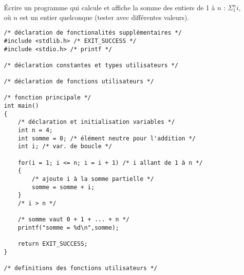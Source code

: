 Écrire un programme qui calcule et affiche la somme des entiers de 1 à
$n$ : $\Sigma_1^n i$, où $n$ est un entier quelconque (tester avec
différentes valeurs). 

\begin{correction}
\begin{verbatim}
/* déclaration de fonctionalités supplémentaires */
#include <stdlib.h> /* EXIT_SUCCESS */
#include <stdio.h> /* printf */

/* déclaration constantes et types utilisateurs */

/* déclaration de fonctions utilisateurs */

/* fonction principale */
int main()
{
    /* déclaration et initialisation variables */
    int n = 4;
    int somme = 0; /* élément neutre pour l'addition */
    int i; /* var. de boucle */

    for(i = 1; i <= n; i = i + 1) /* i allant de 1 à n */
    {
        /* ajoute i à la somme partielle */
        somme = somme + i;
    }
    /* i > n */

    /* somme vaut 0 + 1 + ... + n */
    printf("somme = %d\n",somme);

    return EXIT_SUCCESS;
}

/* definitions des fonctions utilisateurs */
\end{verbatim}
\end{correction}

